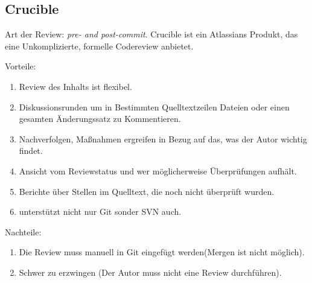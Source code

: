 \subsection{Crucible}
Art der Review: \textit{pre- and post-commit}. Crucible ist ein Atlassians Produkt, das eine Unkomplizierte, formelle Codereview anbietet.

\begin{description}
	\item{Vorteile:}
	\begin{enumerate}
		\item Review des Inhalts ist flexibel.
		\item Diskussionsrunden um in Bestimmten Quelltextzeilen Dateien oder einen gesamten Änderungssatz zu Kommentieren.
		\item Nachverfolgen, Maßnahmen ergreifen in Bezug auf das, was der Autor wichtig findet.
		\item Ansicht vom Reviewstatus und wer möglicherweise Überprüfungen aufhält.
		\item Berichte über Stellen im Quelltext, die noch nicht überprüft wurden.
		\item unterstützt nicht nur Git sonder SVN auch.
	\end{enumerate}
	
	\item{Nachteile:}
	\begin{enumerate}
		\item Die Review muss manuell in Git eingefügt werden(Mergen ist nicht möglich).
		\item Schwer zu erzwingen (Der Autor muss nicht eine Review durchführen).
	\end{enumerate}
\end{description}
